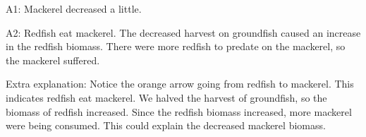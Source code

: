 {{{\begin{minipage}[t]{0.45\textwidth}
{A1: Mackerel decreased a little.

A2: Redfish eat mackerel.  The decreased harvest on groundfish caused an increase in the redfish biomass. There were more redfish to predate on the mackerel, so the mackerel suffered.

Extra explanation: Notice the orange arrow going from redfish to mackerel.  This indicates redfish eat mackerel. We halved the harvest of groundfish, so the biomass of redfish increased.  Since the redfish biomass increased, more mackerel were being consumed.  This could explain the decreased mackerel biomass.
} \end{minipage}

}}}


